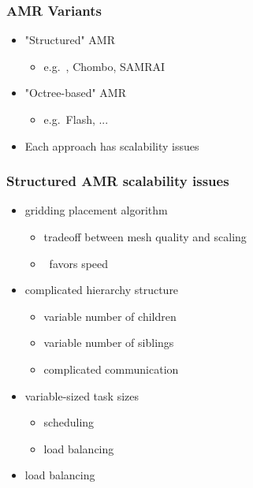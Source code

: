 \begin{frame}[fragile] 
\frametitle{AMR Variants}
\begin{itemize}
\item "Structured" AMR
\begin{itemize}
\item   e.g.~\enzo, Chombo, SAMRAI
\end{itemize}
\item "Octree-based" AMR
\begin{itemize}
\item   e.g.~Flash, ...
\end{itemize}
\item Each approach has scalability issues
\end{itemize}
\end{frame}


\begin{frame}[fragile] 
\frametitle{Structured AMR scalability issues}
\begin{itemize}
\item  gridding placement algorithm
\begin{itemize}
\item tradeoff between mesh quality and scaling
\item \enzo\ favors speed
\end{itemize}
\item  complicated hierarchy structure
\begin{itemize}
\item     variable number of children
\item     variable number of siblings
\item     complicated communication
\end{itemize}
\item  variable-sized task sizes
\begin{itemize}
\item     scheduling
\item     load balancing
\end{itemize}
\item  load balancing 
\end{itemize}
\end{frame}

